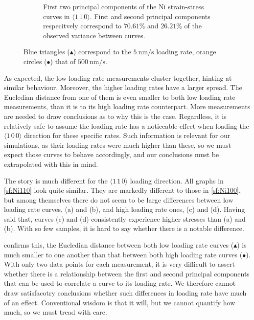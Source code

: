 \begin{figure}
\begin{subfigure}[t]{0.45\linewidth}
        \caption[First two principal components of the Ni strain-stress curves in $\langle 1\,1\,0 \rangle$.]{First two principal components of the Ni strain-stress curves in $\langle 1\,1\,0 \rangle$. First and second principal components respecitvely correspond to $70.61\%$ and $26.21\%$ of the observed variance between curves.}
        \label{sf:Ni110_pca}
    \end{subfigure}
    \caption{Blue triangles (\textcolor{matlabBlue}{$\blacktriangle$}) correspond to the $\SI{5}{\nano\metre\per\second}$ loading rate, orange circles (\textcolor{matlabOrange}{$\bullet$}) that of $\SI{500}{\nano\metre\per\second}$.}
    \label{f:Ni_pca}
\end{figure}

As expected, the low loading rate measurements cluster together, hinting at similar behaviour. Moreover, the higher loading rates have a larger spread. The Eucledian distance from one of them is even smaller to both low loading rate measurements, than it is to its high loading rate counterpart. More measurements are needed to draw conclusions as to why this is the case. Regardless, it is relatively safe to assume the loading rate has a noticeable effect when loading the $\langle 1\, 0\, 0 \rangle$ direction for these specific rates. Such information is relevant for our simulations, as their loading rates were much higher than these, so we must expect those curves to behave accordingly, and our conclusions must be extrapolated with this in mind.

The story is much different for the $\langle 1\, 1\, 0 \rangle$ loading direction. All graphs in \cref{sf:Ni110} look quite similar. They are markedly different to those in \cref{sf:Ni100}, but among themselves there do not seem to be large differences between low loading rate curves, (a) and (b), and high loading rate ones, (c) and (d). Having said that, curves (c) and (d) consistently experience higher stresses than (a) and (b). With so few samples, it is hard to say whether there is a notable difference.

 confirms this, the Eucledian distance between both low loading rate curves (\textcolor{matlabBlue}{$\blacktriangle$}) is much smaller to one another than that between both high loading rate curves (\textcolor{matlabOrange}{$\bullet$}). With only two data points for each measurement, it is very difficult to assert whether there is a relationship between the first and second principal components that can be used to correlate a curve to its loading rate. We therefore cannot draw satisfacotry conclusions whether such differences in loading rate have much of an effect. Conventional wisdom is that it will, but we cannot quantify how much, so we must tread with care.


